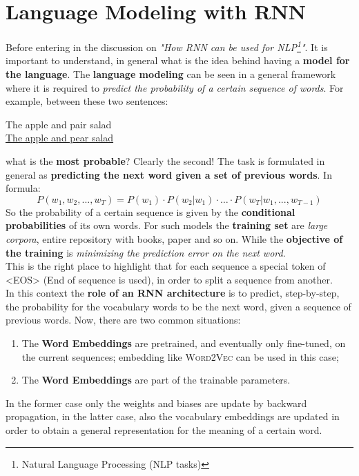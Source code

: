 \section{Language Modeling with RNN}
Before entering in the discussion on \textit{"How RNN can be used for NLP\footnote{
    Natural Language Processing (NLP tasks)
}"}. It is important to understand, in general what is the idea behind having a \textbf{model for the language}. The \textbf{language modeling} can be seen in a general framework where it is required to \textit{predict the probability of a certain sequence of words}. For example, between these two sentences:
\begin{center}
    The apple and pair salad\\
    \underline{The apple and pear salad}
\end{center} 
what is the \textbf{most probable}? Clearly the second! The task is formulated in general as \textbf{predicting the next word given a set of previous words}. In formula:
\begin{equation}
    P(w_1, w_2,...,w_T)=P(w_1) \cdot P(w_2|w_1)\cdot \dots \cdot P(w_T|w_1,...,w_{T-1})
\end{equation}
So the probability of a certain sequence is given by the \textbf{conditional probabilities} of its own words. For such models the \textbf{training set} are \textit{large corpora}, entire repository with books, paper and so on. While the \textbf{objective of the training} is \textit{minimizing the prediction error on the next word}. \\
This is the right place to highlight that for each sequence a special token of <EOS> (End of sequence is used), in order to split a sequence from another.\\
In this context the \textbf{role of an RNN architecture} is to predict, step-by-step, the probability for the vocabulary words to be the next word, given a sequence of previous words. Now, there are two common situations:
\begin{enumerate}
    \item The \textbf{Word Embeddings} are pretrained, and eventually only fine-tuned, on the current sequences; embedding like \textsc{Word2Vec} can be used in this case; 
    \item The \textbf{Word Embeddings} are part of the trainable parameters.
\end{enumerate}
\noindent
In the former case only the weights and biases are update by backward propagation, in the latter case, also the vocabulary embeddings are updated in order to obtain a general representation for the meaning of a certain word.

